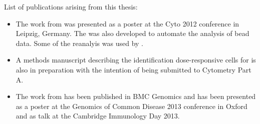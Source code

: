 \nobibliography*
\begin{publications}

List of publications arising from this thesis:

\begin{itemize}
 \item
   The work from  was presented as a poster at the Cyto 2012 conference in Leipzig, Germany.
   The  was also developed to automate the analysis of bead data.
   Some of the reanalyis was used by .
 \item
   A methods manuscript describing the identification dose-responsive cells for  is also in preparation with the intention of being submitted to Cytometry Part A.
 \item
   The work from  has been published in BMC Genomics  and has been presented as a poster
   at the Genomics of Common Disease 2013 conference in Oxford and as talk at the Cambridge Immunology Day 2013.
\end{itemize}

\end{publications}

